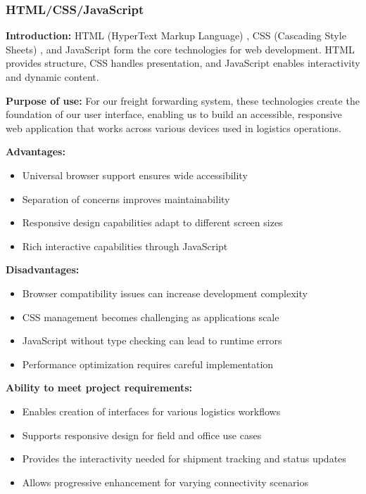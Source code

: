 \subsubsection{HTML/CSS/JavaScript}
\textbf{Introduction:} HTML (HyperText Markup Language) \cite{html5}, CSS (Cascading Style Sheets) \cite{css}, and JavaScript \cite{js} form the core technologies for web development. HTML provides structure, CSS handles presentation, and JavaScript enables interactivity and dynamic content.

\textbf{Purpose of use:} For our freight forwarding system, these technologies create the foundation of our user interface, enabling us to build an accessible, responsive web application that works across various devices used in logistics operations.

\textbf{Advantages:}
\begin{itemize}
    \item Universal browser support ensures wide accessibility
    \item Separation of concerns improves maintainability
    \item Responsive design capabilities adapt to different screen sizes
    \item Rich interactive capabilities through JavaScript
\end{itemize}

\textbf{Disadvantages:}
\begin{itemize}
    \item Browser compatibility issues can increase development complexity
    \item CSS management becomes challenging as applications scale
    \item JavaScript without type checking can lead to runtime errors
    \item Performance optimization requires careful implementation
\end{itemize}

\textbf{Ability to meet project requirements:}
\begin{itemize}
    \item Enables creation of interfaces for various logistics workflows
    \item Supports responsive design for field and office use cases
    \item Provides the interactivity needed for shipment tracking and status updates
    \item Allows progressive enhancement for varying connectivity scenarios
\end{itemize}

